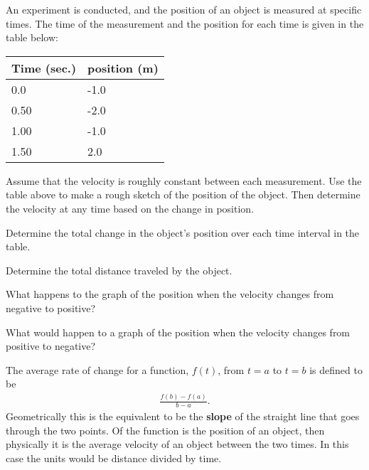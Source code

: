 
\begin{problem}

\item An experiment is conducted, and the position of an object is
  measured at specific times. The time of the measurement and the
  position for each time is given in the table below: \\
  \begin{tabular}{l|l}
    Time (sec.) & position (m) \\ \hline
    0.0  & -1.0 \\
    0.50 & -2.0 \\
    1.00 & -1.0 \\
    1.50 &  2.0
  \end{tabular}
  \begin{subproblem}
  \item Assume that the velocity is roughly constant between each
    measurement. Use the table above to make a rough sketch of the
    position of the object. Then determine the velocity at any time
    based on the change in position.

    \scalebox{0.7}{}


    \clearpage

  \item Determine the total change in the object's position over each
    time interval in the table.

      \vfill

  \item Determine the total distance traveled by the object.

    \vfill

  \item What happens to the graph of the position when the velocity
    changes from negative to positive?
    \vspace{4em}

  \item What would happen to a graph of the position when the velocity
    changes from positive to negative?
    \vspace{4em}

  \end{subproblem}


\clearpage

The average rate of change for a function, $f(t)$, from $t=a$ to $t=b$ is
defined to be
\begin{eqnarray*}
  \frac{f(b)-f(a)}{b-a}.
\end{eqnarray*}
Geometrically this is the equivalent to be the \textbf{slope} of the
straight line that goes through the two points. Of the function is the
position of an object, then physically it is the average velocity of
an object between the two times. In this case the units would be
distance divided by time.


\end{problem}
